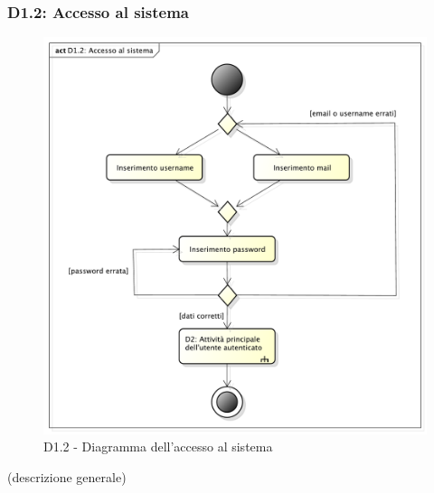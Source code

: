 		\subsubsection{D1.2: Accesso al sistema} %
		\label{ssub:accesso_al_sistema}
		\begin{figure}[!htbp]
			\centering
			\centerline{\includegraphics[scale=0.45]{./images/D1_2.pdf}}
			\caption{D1.2 - Diagramma dell'accesso al sistema}
		\end{figure}
		\noindent
		[TO DO] (descrizione generale) \newline


